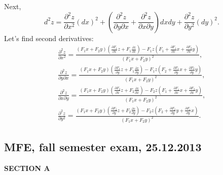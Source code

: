 \begin{enumerate}
Next,
$$
d^2z = \frac{\partial^2 z}{\partial x^2} (dx)^2 + (\frac{\partial^2 z}{\partial y \partial x}+\frac{\partial^2 z}{\partial x\partial y}) dx dy + \frac{\partial^2 z}{\partial y^2} (dy)^2.
$$
Let's find second derivatives:
\begin{align*}
\frac{\partial^2 z}{\partial x^2}= \frac{(F_1 x+F_2 y)(\frac{\partial F_1}{\partial x} z + F_1 \frac{\partial z}{\partial x} ) - F_1 z(F_1 + \frac{\partial F_1}{\partial x} x + \frac{\partial F_2}{\partial x} y)}{(F_1 x+F_2 y)^2},\\
%
\frac{\partial^2 z}{\partial y \partial x} = \frac{(F_1 x+F_2 y)(\frac{\partial F_1}{\partial y} z + F_1 \frac{\partial z}{\partial y} ) - F_1 z(F_2 + \frac{\partial F_1}{\partial y}x +\frac{\partial F_2}{\partial y} y)}{(F_1 x+F_2 y)^2},\\
%
\frac{\partial^2 z}{\partial x\partial y} = \frac{(F_1 x+F_2 y)(\frac{\partial F_2}{\partial x} z + F_2 \frac{\partial z}{\partial x} ) - F_2 z(F_1 + \frac{\partial F_1}{\partial x}x +\frac{\partial F_2}{\partial x} y)}{(F_1 x+F_2 y)^2},\\
%
\frac{\partial^2 z}{\partial y^2} = \frac{(F_1 x+F_2 y)(\frac{\partial F_2}{\partial y} z + F_2 \frac{\partial z}{\partial y} ) - F_2 z(F_2 + \frac{\partial F_2}{\partial y} y + \frac{\partial F_1}{\partial y} x)}{(F_1 x+F_2 y)^2}.
\end{align*}


\end{enumerate}

\subsection{MFE, fall semester exam, 25.12.2013}

\textbf{SECTION A}

